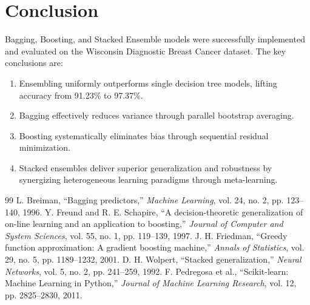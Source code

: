 \documentclass[12pt,a4paper]{article}
\begin{document}
\section{Conclusion}
Bagging, Boosting, and Stacked Ensemble models were successfully implemented and evaluated on the Wisconsin Diagnostic Breast Cancer dataset.
The key conclusions are:
\begin{enumerate}
\item Ensembling uniformly outperforms single decision tree models, lifting accuracy from 91.23\% to 97.37\%.
\item Bagging effectively reduces variance through parallel bootstrap averaging.
\item Boosting systematically eliminates bias through sequential residual minimization.
\item Stacked ensembles deliver superior generalization and robustness by synergizing heterogeneous learning paradigms through meta-learning.
\end{enumerate}

\begin{thebibliography}{99}
 L. Breiman, ``Bagging predictors,'' \emph{Machine Learning}, vol. 24, no. 2, pp. 123--140, 1996.
 Y. Freund and R. E. Schapire, ``A decision-theoretic generalization of on-line learning and an application to boosting,'' \emph{Journal of Computer and System Sciences}, vol. 55, no. 1, pp. 119--139, 1997.
 J. H. Friedman, ``Greedy function approximation: A gradient boosting machine,'' \emph{Annals of Statistics}, vol. 29, no. 5, pp. 1189--1232, 2001.
 D. H. Wolpert, ``Stacked generalization,'' \emph{Neural Networks}, vol. 5, no. 2, pp. 241--259, 1992.
 F. Pedregosa et al., ``Scikit-learn: Machine Learning in Python,'' \emph{Journal of Machine Learning Research}, vol. 12, pp. 2825--2830, 2011.
\end{thebibliography}
\end{document}

